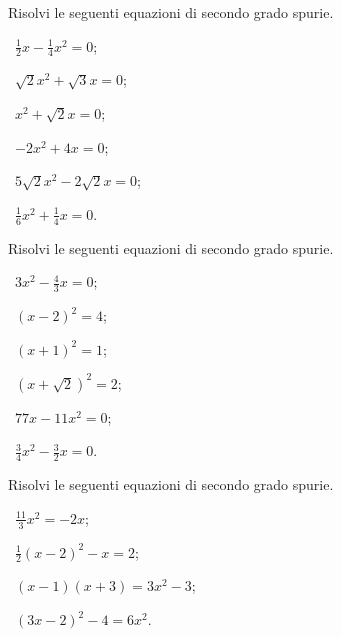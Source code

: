 \begin{esercizio}[\Ast]
 \label{ese:3.8}
Risolvi le seguenti equazioni di secondo grado spurie.
\begin{multicols}{3}
 \begin{enumeratea}
 \item~$\frac{1}{2} x - \frac{1}{4} x^{2} = 0$;
 \item~$\sqrt{2} x^{2} + \sqrt{3} x = 0$;
 \item~$x^{2} + \sqrt{2} x = 0$;
 \item~$- 2x^{2} + 4x = 0$;
 \item~$5 \sqrt{2} x^{2} - 2 \sqrt{2} x = 0$;
 \item~$\frac{1}{6} x^{2} + \frac{1}{4} x = 0$.
 \end{enumeratea}
 \end{multicols}
\end{esercizio}

\begin{esercizio}[\Ast]
 \label{ese:3.9}
Risolvi le seguenti equazioni di secondo grado spurie.
\begin{multicols}{3}
 \begin{enumeratea}
 \item~$3x^{2} - \frac{4}{3} x = 0$;
 \item~$(x - 2)^{2} = 4$;
 \item~$(x + 1)^{2} = 1$;
 \item~$(x + \sqrt{2})^{2} = 2$;
 \item~$77 x - 11 x^{2} = 0$;
 \item~$\frac{3}{4} x^{2} - \frac{3}{2} x = 0$.
 \end{enumeratea}
 \end{multicols}
\end{esercizio}

\begin{esercizio}[\Ast]
 \label{ese:3.10}
Risolvi le seguenti equazioni di secondo grado spurie.
\begin{multicols}{2}
 \begin{enumeratea}
 \item~$\frac{11}{3} x^{2} = - 2 x$;
 \item~$\frac{1}{2} ( x - 2 )^{2} - x = 2$;
 \item~$(x - 1) (x + 3) = 3 x^{2} - 3$;
 \item~$(3 x - 2)^{2} - 4 = 6 x^{2}$.
 \end{enumeratea}
 \end{multicols}
\end{esercizio}

